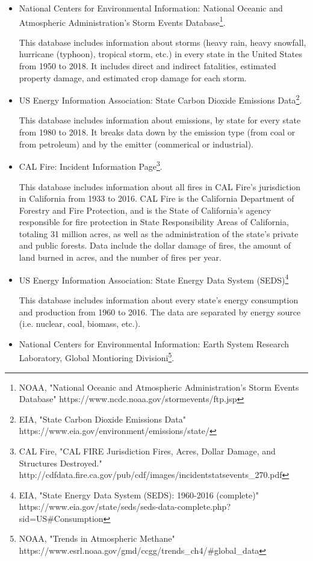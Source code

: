 \documentclass[10pt,]{article}
\let\rmarkdownfootnote\footnote%
\def\footnote{\protect\rmarkdownfootnote}
\begin{document}
\begin{itemize}
  \item National Centers for Environmental Information: National Oceanic and Atmospheric Administration's Storm Events Database\footnote{NOAA, "National Oceanic and Atmospheric Administration's Storm Events Database" https://www.ncdc.noaa.gov/stormevents/ftp.jsp}.
  
  This database includes information about storms (heavy rain, heavy snowfall, hurricane (typhoon), tropical storm, etc.) in every state in the United States from 1950 to 2018. It includes direct and indirect fatalities, estimated property damage, and estimated crop damage for each storm.
  \item US Energy Information Association: State Carbon Dioxide Emissions Data\footnote{EIA, "State Carbon Dioxide Emissions Data" https://www.eia.gov/environment/emissions/state/}.
  
  This database includes information about emissions, by state for every state from 1980 to 2018. It breaks data down by the emission type (from coal or from petroleum) and by the emitter (commerical or industrial).
  \item CAL Fire: Incident Information Page\footnote{CAL Fire, "CAL FIRE Jurisdiction Fires, Acres, Dollar Damage, and Structures Destroyed." \newline http://cdfdata.fire.ca.gov/pub/cdf/images/incidentstatsevents\_270.pdf}.
  
  This database includes information about all fires in CAL Fire's jurisdiction in California from 1933 to 2016. CAL Fire is the California Department of Forestry and Fire Protection, and is the State of California's agency responsible for fire protection in State Responsibility Areas of California, totaling 31 million acres, as well as the administration of the state's private and public forests. Data include the dollar damage of fires, the amount of land burned in acres, and the number of fires per year.
  \item US Energy Information Association: State Energy Data System (SEDS)\footnote{EIA, "State Energy Data System (SEDS): 1960-2016 (complete)" \newline https://www.eia.gov/state/seds/seds-data-complete.php?sid=US\#Consumption}
  
  This database includes information about every state's energy consumption and production from 1960 to 2016. The data are separated by energy source (i.e. nuclear, coal, biomass, etc.).
  \item National Centers for Environmental Information: Earth System Research Laboratory, Global Montioring Divisioni\footnote{NOAA, "Trends in Atmospheric Methane" https://www.esrl.noaa.gov/gmd/ccgg/trends\_ch4/\#global\_data}.
  

\end{itemize}
\end{document}
